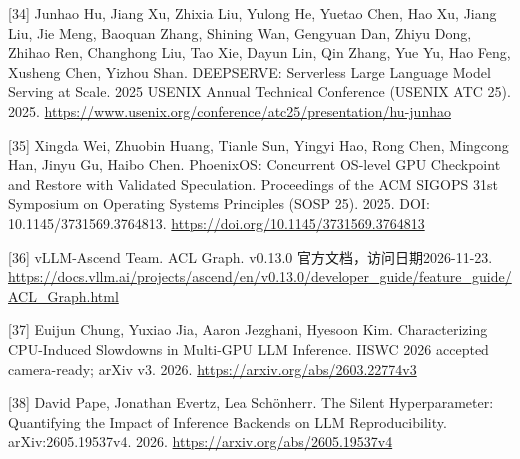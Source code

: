 \documentclass[UTF8,11pt,fontset=windows]{ctexart}
\begin{document}
\leavevmode{}%
{[}34{]} Junhao Hu, Jiang Xu, Zhixia Liu, Yulong He, Yuetao Chen, Hao Xu, Jiang Liu, Jie Meng, Baoquan Zhang, Shining Wan, Gengyuan Dan, Zhiyu Dong, Zhihao Ren, Changhong Liu, Tao Xie, Dayun Lin, Qin Zhang, Yue Yu, Hao Feng, Xusheng Chen, Yizhou Shan. DEEPSERVE: Serverless Large Language Model Serving at Scale. 2025 USENIX Annual Technical Conference (USENIX ATC 25). 2025. \url{https://www.usenix.org/conference/atc25/presentation/hu-junhao}

\leavevmode{}%
{[}35{]} Xingda Wei, Zhuobin Huang, Tianle Sun, Yingyi Hao, Rong Chen, Mingcong Han, Jinyu Gu, Haibo Chen. PhoenixOS: Concurrent OS-level GPU Checkpoint and Restore with Validated Speculation. Proceedings of the ACM SIGOPS 31st Symposium on Operating Systems Principles (SOSP 25). 2025. DOI: 10.1145/3731569.3764813. \url{https://doi.org/10.1145/3731569.3764813}

\leavevmode{}%
{[}36{]} vLLM-Ascend Team. ACL Graph. v0.13.0 官方文档，访问日期2026-11-23. \url{https://docs.vllm.ai/projects/ascend/en/v0.13.0/developer_guide/feature_guide/ACL_Graph.html}

\leavevmode{}%
{[}37{]} Euijun Chung, Yuxiao Jia, Aaron Jezghani, Hyesoon Kim. Characterizing CPU-Induced Slowdowns in Multi-GPU LLM Inference. IISWC 2026 accepted camera-ready; arXiv v3. 2026. \url{https://arxiv.org/abs/2603.22774v3}

\leavevmode{}%
{[}38{]} David Pape, Jonathan Evertz, Lea Schönherr. The Silent Hyperparameter: Quantifying the Impact of Inference Backends on LLM Reproducibility. arXiv:2605.19537v4. 2026. \url{https://arxiv.org/abs/2605.19537v4}
\end{document}

